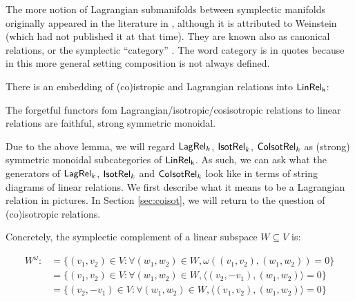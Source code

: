 The more  notion of Lagrangian submanifolds between symplectic manifolds originally appeared in the literature in \cite{Guillemin}, although it is attributed to  Weinstein (which had not published it at that time).  They are known also as canonical relations, or the symplectic ``category'' \cite{weinsteinsymplectic}.  The word category is in quotes because in this more general setting composition is not always defined.




There is an embedding of (co)istropic and Lagrangian relations into $\sf LinRel_k$:
\begin{lemma}
\label{lemma:strong}
The forgetful functors fom Lagrangian/isotropic/cosisotropic relations to linear relations  are faithful, strong symmetric monoidal.
\end{lemma}
Due to the above lemma, we will regard $\mathsf{Lag}\mathsf{Rel}_k$, ${\sf Isot}\mathsf{Rel}_k$, ${\sf Co}{\sf Isot}\mathsf{Rel}_k$ as (strong) symmetric monoidal subcategories of $\sf LinRel_k$.
As such, we can ask what the generators of $\mathsf{Lag}\mathsf{Rel}_k$, ${\sf Isot}\mathsf{Rel}_k$ and ${\sf Co}{\sf Isot}\mathsf{Rel}_k$ look like in terms of string diagrams of linear relations. We first describe what it means to be a Lagrangian relation in pictures.  In Section \ref{sec:coisot}, we will return to the question of (co)isotropic relations.

Concretely, the symplectic complement of a linear subspace $W \subseteq V$ is:

\begin{align*}
W^\omega :&= \{(v_1,v_2) \in V : \forall (w_1,w_2) \in W, \omega((v_1,v_2),(w_1,w_2))=0 \}\\
                    &= \{(v_1,v_2) \in V : \forall (w_1,w_2) \in W,  \langle (v_2,-v_1) ,(w_1,w_2)\rangle =0 \}\\
                    &= \{(v_2,-v_1) \in V : \forall (w_1,w_2) \in W,  \langle (v_1,v_2) ,(w_1,w_2)\rangle =0 \}
\end{align*}

